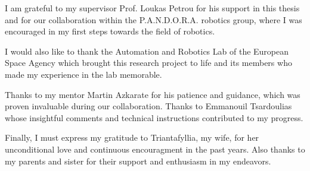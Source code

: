 \begin{acknowledgements}

I am grateful to my supervisor Prof. Loukas Petrou for his support in
this thesis and for our collaboration within the P.A.N.D.O.R.A. robotics
group, where I was encouraged in my first steps towards the field of robotics.

I would also like to thank the Automation and Robotics Lab of
the European Space Agency which brought this research project to life
and its members who made my experience in the lab memorable.

Thanks to my mentor Martin Azkarate for his patience and guidance,
which was proven invaluable during our collaboration.
Thanks to Emmanouil Tsardoulias whose insightful comments and technical
instructions contributed to my progress.

Finally, I must express my gratitude to Triantafyllia, my wife, for her
unconditional love and continuous encouragment in the past years.
Also thanks to my parents and sister for their support and enthusiasm in
my endeavors.

\end{acknowledgements}

